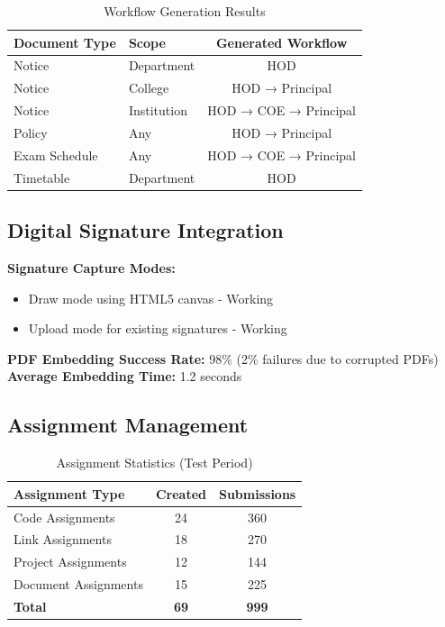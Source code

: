 \begin{table}[H]
\centering
\begin{tabular}{|l|l|c|}
\hline
\textbf{Document Type} & \textbf{Scope} & \textbf{Generated Workflow} \\
\hline
Notice & Department & HOD \\
Notice & College & HOD → Principal \\
Notice & Institution & HOD → COE → Principal \\
Policy & Any & HOD → Principal \\
Exam Schedule & Any & HOD → COE → Principal \\
Timetable & Department & HOD \\
\hline
\end{tabular}
\caption{Workflow Generation Results}
\end{table}

\subsection{Digital Signature Integration}

\textbf{Signature Capture Modes:}
\begin{itemize}
\item Draw mode using HTML5 canvas - Working
\item Upload mode for existing signatures - Working
\end{itemize}

\textbf{PDF Embedding Success Rate:} 98\% (2\% failures due to corrupted PDFs)\\
\textbf{Average Embedding Time:} 1.2 seconds

\subsection{Assignment Management}

\begin{table}[H]
\centering
\begin{tabular}{|l|c|c|}
\hline
\textbf{Assignment Type} & \textbf{Created} & \textbf{Submissions} \\
\hline
Code Assignments & 24 & 360 \\
Link Assignments & 18 & 270 \\
Project Assignments & 12 & 144 \\
Document Assignments & 15 & 225 \\
\hline
\textbf{Total} & \textbf{69} & \textbf{999} \\
\hline
\end{tabular}
\caption{Assignment Statistics (Test Period)}
\end{table}


